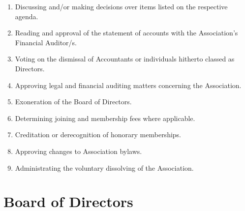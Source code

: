 \begin{enumerate}
\item Discussing and/or making decisions over items listed on the respective agenda.
\item Reading and approval of the statement of accounts with the Association’s Financial Auditor/s.
\item Voting on the dismissal of Accountants or individuals hitherto classed as Directors.
\item Approving legal and financial auditing matters concerning the Association.
\item Exoneration of the Board of Directors.
\item Determining joining and membership fees where applicable.
\item Creditation or derecognition of honorary memberships.
\item Approving changes to Association bylaws.
\item Administrating the voluntary dissolving of the Association.
\end{enumerate}





\section{Board of Directors}


